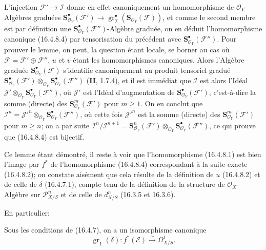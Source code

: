 L'injection $\mathscr{F}'\to\mathscr{I}$ donne en effet canoniquement un
homomorphisme de $\mathcal{O}_Y$-Algèbres graduées\linebreak
$\mathbf{S}_{\mathcal{O}_Y}^{\bullet}(\mathscr{F}')\to\allowbreak
\operatorname{gr}_{\mathscr{I}}^\bullet
(\mathbf{S}_{\mathcal{O}_Y}(\mathscr{F}))$, et comme le second membre est par
définition une $\mathbf{S}_{\mathcal{O}_Y}^{\bullet}(\mathscr{F}'')$-Algèbre
graduée, on en déduit l'homomorphisme canonique (16.4.8.4) par tensorisation du
précédent avec $\mathbf{S}_{\mathcal{O}_Y}^{\bullet}(\mathscr{F}'')$. Pour
prouver le lemme, on peut, la question étant locale, se borner au cas où
$\mathscr{F}=\mathscr{F}'\oplus\mathscr{F}''$, $u$ et $v$ étant les
homomorphismes canoniques. Alors l'Algèbre graduée
$\mathbf{S}_{\mathcal{O}_Y}^{\bullet}(\mathscr{F})$ s'identifie canoniquement au
produit tensoriel gradué
$\mathbf{S}_{\mathcal{O}_Y}^{\bullet}(\mathscr{F}')
\otimes_{\mathcal{O}_Y}
\mathbf{S}_{\mathcal{O}_Y}^{\bullet}(\mathscr{F}'')$ (\textbf{II}, 1.7.4), et il est
immédiat que $\mathscr{I}$ est alors l'Idéal
$\mathscr{J}'\otimes_{\mathcal{O}_Y}
\mathbf{S}_{\mathcal{O}_Y}^{\bullet}(\mathscr{F}'')$, où $\mathscr{J}'$ est
l'Idéal d'augmentation de
$\mathbf{S}_{\mathcal{O}_Y}^{\bullet}(\mathscr{F}')$, c'est-à-dire la somme
(directe) des $\mathbf{S}_{\mathcal{O}_Y}^m(\mathscr{F}')$ pour $m\geq1$. On en
conclut que $\mathscr{I}^n=\mathscr{J}'^n\otimes_{\mathcal{O}_Y}
\mathbf{S}_{\mathcal{O}_Y}^{\bullet}(\mathscr{F}'')$, où cette fois
$\mathscr{J}'^n$ est la somme (directe) des
$\mathbf{S}_{\mathcal{O}_Y}^m(\mathscr{F}')$ pour $m\geq n$; on a par suite
$\mathscr{I}^n/\mathscr{I}^{n+1}=
\mathbf{S}_{\mathcal{O}_Y}^n(\mathscr{F}')\otimes_{\mathcal{O}_Y}
\mathbf{S}_{\mathcal{O}_Y}^{\bullet}(\mathscr{F}'')$, ce qui prouve que
(16.4.8.4) est bijectif.

Ce lemme étant démontré, il reste à voir que l'homomorphisme (16.4.8.1) est
bien l'image par $f^*$ de l'homomorphisme (16.4.8.4) correspondant à la suite
exacte (16.4.8.2); on constate aisément que cela résulte de la définition de
$u$ (16.4.8.2) et de celle de $\delta$ (16.4.7.1), compte tenu de la définition
de la structure de $\mathcal{O}_X$-Algèbre sur $\mathscr{P}_{X/S}^n$ et de
celle de $d_{X/S}^n$ (16.3.5 et 16.3.6).

En particulier:

\begin{corollary}[16.4.9]
\label{IV.16.4.9}
Sous les conditions de \textup{(16.4.7)}, on a un isomorphisme canonique
\[
  \operatorname{gr}_1(\delta):f^*(\mathscr{E})
  \xrightarrow{\sim}\varOmega_{X/S}^1.
  \tag{16.4.9.1}
  \label{IV.16.4.9.1}
\]
\end{corollary}

